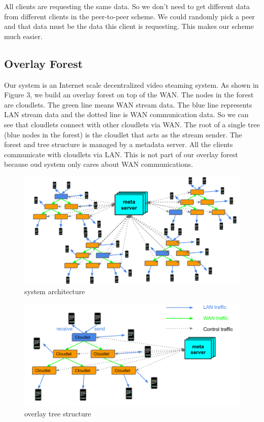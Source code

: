 \documentclass[letterpaper,twocolumn,10pt]{article}
\begin{document}
All clients are requesting the same data. So we don’t need to get different data from different clients in the peer-to-peer scheme. We could randomly pick a peer and that data must be the data this client is requesting. This makes our scheme much easier.

\subsection{Overlay Forest}

Our system is an Internet scale decentralized video steaming system. As shown in Figure 3, we build an overlay forest on top of the WAN. The nodes in the forest are cloudlets. The green line means WAN stream data. The blue line represents LAN stream data and the dotted line is WAN communication data. So we can see that cloudlets connect with other cloudlets via WAN. The root of a single tree (blue nodes in the forest) is the cloudlet that acts as the stream sender. The forest and tree structure is managed by a metadata server. All the clients communicate with cloudlets via LAN. This is not part of our overlay forest because oud system only cares about WAN communications. 

\begin{figure}[t]
\begin{center}
\includegraphics[scale=0.3]{pic/overlay_forest.png}
\end{center}
\caption{system architecture}
\end{figure}

\begin{figure}[h]
\begin{center}
\includegraphics[scale=0.3]{pic/overlay_tree.png}
\end{center}
\caption{overlay tree structure}
\end{figure}
\end{document}
